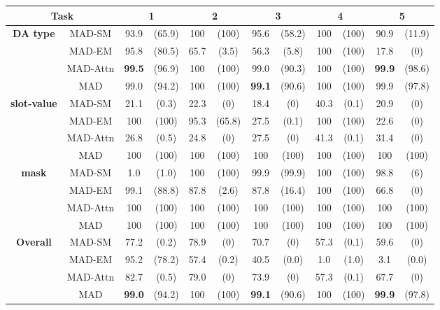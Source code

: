 \begin{table}[htbp]
\small
\begin{center}
\begin{tabular}{ c | c | c c | c c | c c | c c | c c }
  \hline
    \multicolumn{2}{c|}{\bf Task} & \multicolumn{2}{c|}{1} & \multicolumn{2}{c|}{2} & \multicolumn{2}{c|}{3} & \multicolumn{2}{c|}{4} & \multicolumn{2}{c}{5}\\
  \hline
  \multirow{4}{*}{\bf DA type} & MAD-SM & 93.9 & (65.9) & 100 & (100) & 95.6 & (58.2) & 100 & (100) & 90.9 & (11.9) \\
    & MAD-EM & 95.8 & (80.5) & 65.7 & (3.5) & 56.3 & (5.8) & 100 & (100) & 17.8 & (0) \\
    & MAD-Attn & {\bf 99.5} & (96.9) & 100 & (100) & 99.0 & (90.3) & 100 & (100) & {\bf 99.9} & (98.6) \\
    & MAD & 99.0 & (94.2) & 100 & (100) & {\bf 99.1} & (90.6) & 100 & (100) & 99.9 & (97.8) \\
  \hline
  \multirow{4}{*}{\bf slot-value} & MAD-SM & 21.1 & (0.3) & 22.3 & (0) & 18.4 & (0) & 40.3 & (0.1) & 20.9 & (0) \\
    & MAD-EM & 100 & (100) & 95.3 & (65.8) & 27.5 & (0.1) & 100 & (100) & 22.6 & (0) \\
    & MAD-Attn & 26.8 & (0.5) & 24.8 & (0) & 27.5 & (0) & 41.3 & (0.1) & 31.4 & (0) \\
    & MAD & 100 & (100) & 100 & (100) & 100 & (100) & 100 & (100) & 100 & (100) \\
  \hline
  \multirow{4}{*}{\bf mask} & MAD-SM & 1.0 & (1.0) & 100 & (100) & 99.9 & (99.9) & 100 & (100) & 98.8 & (6) \\
    & MAD-EM & 99.1 & (88.8) & 87.8 & (2.6) & 87.8 & (16.4) & 100 & (100) & 66.8 & (0) \\
    & MAD-Attn & 100 & (100) & 100 & (100) & 100 & (100) & 100 & (100) & 100 & (100) \\
    & MAD & 100 & (100) & 100 & (100) & 100 & (100) & 100 & (100) & 100 & (100) \\
  \hline
  \multirow{4}{*}{\bf Overall} & MAD-SM & 77.2 & (0.2) & 78.9 & (0) & 70.7 & (0) & 57.3 & (0.1) & 59.6 & (0) \\
    & MAD-EM & 95.2 & (78.2) & 57.4 & (0.2) & 40.5 & (0.0) & 1.0 & (1.0) & 3.1 & (0.0)\\
    & MAD-Attn & 82.7 & (0.5) & 79.0 & (0) & 73.9 & (0) & 57.3 & (0.1) & 67.7 & (0) \\
    & MAD & {\bf 99.0} & (94.2) & 100 & (100) & {\bf 99.1} & (90.6) & 100 & (100) & {\bf 99.9} & (97.8)\\
  \hline
\end{tabular}


\end{center}
\end{table}
